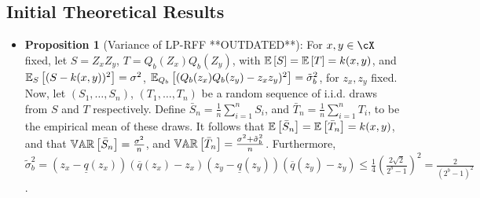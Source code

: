 \documentclass[12pt]{article}
\newcommand{\bS}{\bar{S}}
\newcommand{\bT}{\bar{T}}
\newcommand{\sq}{\sqrt{2}}
\newcommand{\tsigma}{\tilde{\sigma}}
\newcommand{\ulq}{\underline{q}}
\newcommand{\olq}{\overline{q}}
\begin{document}
\subsection{Initial Theoretical Results}
\begin{itemize}
	\item \textbf{Proposition 1} (Variance of LP-RFF **OUTDATED**):  For $x,y\in\cX$ fixed, let $S=Z_x Z_y$, $T = Q_b(Z_x)Q_b(Z_y)$, with $\expect{}{S}=\expect{}{T} = k(x,y)$, and $\expect{S}{(S-k(x,y))^2} = \sigma^2$, $\expect{Q_b}{(Q_b(z_x)Q_b(z_y)-z_x z_y)^2} = \tsigma_b^2$, for $z_x,z_y$ fixed.  Now, let $(S_1,\ldots,S_n)$, $(T_1,\ldots,T_n)$ be a random sequence of i.i.d. draws from $S$ and $T$ respectively.  Define $\bar{S}_n = \frac{1}{n}\sum_{i=1}^n S_i$, and $\bar{T}_n =  \frac{1}{n}\sum_{i=1}^n T_i$, to be the empirical mean of these draws.  It follows that $\expect{}{\bS_n} = \expect{}{\bT_n} = k(x,y)$, and that
	$\var{}{\bS_n} = \frac{\sigma^2}{n}$, and $\var{}{\bT_n} = \frac{\sigma^2 + \tsigma_b^2}{n}$.
	Furthermore, $\tsigma_b^2 = (z_x-\ulq(z_x))(\olq(z_x)-z_x)(z_y-\ulq(z_y))(\olq(z_y)-z_y) \leq \frac{1}{4}(\frac{2\sq}{2^b-1})^2= \frac{2}{(2^b-1)^2}$.
	

\end{itemize}
\end{document}
